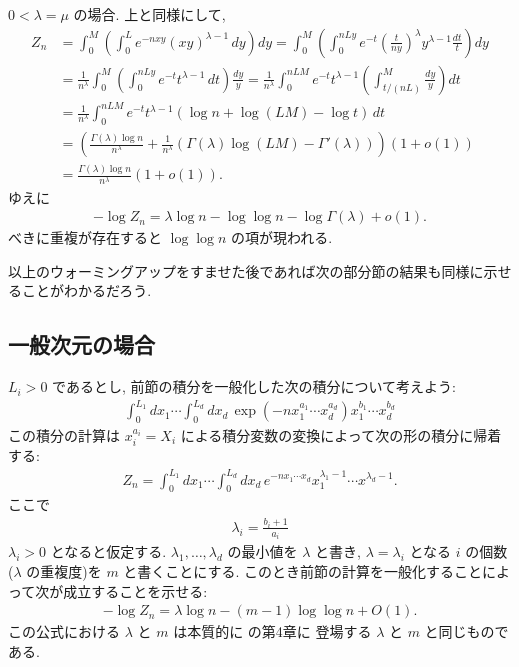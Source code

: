 \documentclass[12pt,twoside]{jarticle}
\theoremstyle{jplain}
\theoremstyle{jplain}
\theoremstyle{jplain}
\numberwithin{theorem}{section}
\numberwithin{equation}{section}
\numberwithin{figure}{section}
\numberwithin{table}{section}
\begin{document}
$0<\lambda=\mu$ の場合. 上と同様にして,
\begin{align*}
Z_n
&=\int_0^M \left(\int_0^L e^{-nxy} (xy)^{\lambda-1}\,dy\right)dy
=\int_0^M \left(\int_0^{nLy} e^{-t} \left(\frac{t}{ny}\right)^\lambda y^{\lambda-1}\frac{dt}{t}\right)dy
\\ &
=\frac{1}{n^\lambda}\int_0^M \left(\int_0^{nLy} e^{-t} t^{\lambda-1}\,dt\right)\frac{dy}{y}
=\frac{1}{n^\lambda}\int_0^{nLM} e^{-t} t^{\lambda-1} \left(\int_{t/(nL)}^{M}\frac{dy}{y}\right)dt
\\ &
=\frac{1}{n^\lambda}\int_0^{nLM} e^{-t} t^{\lambda-1}
\left(\log n + \log(LM) -\log t \right)\,dt
\\ &
=\left(
\frac{\Gamma(\lambda)\log n}{n^\lambda}
+\frac{1}{n^\lambda}
\left(\Gamma(\lambda)\log(LM)-\Gamma'(\lambda)\right)
\right)(1+o(1))
\\ &
=\frac{\Gamma(\lambda)\log n}{n^\lambda}(1+o(1)).
\end{align*}
ゆえに
\begin{align*}
-\log Z_n = \lambda\log n - \log\log n -\log\Gamma(\lambda)+o(1).
\end{align*}
べきに重複が存在すると $\log\log n$ の項が現われる.

以上のウォーミングアップをすませた後であれば次の部分節の結果も同様に示せることがわかるだろう.


\subsection{一般次元の場合}

$L_i>0$ であるとし, 
前節の積分を一般化した次の積分について考えよう:
\begin{align*}
\int_0^{L_1}dx_1\cdots\int_0^{L_d}dx_d\,
\exp\left(-n x_1^{a_1}\cdots x_d^{a_d}\right) x_1^{b_1}\cdots x_d^{b_d}
\end{align*}
この積分の計算は $x_i^{a_i}=X_i$ による積分変数の変換によって次の形の積分に帰着する:
\begin{align*}
Z_n = \int_0^{L_1}dx_1\cdots\int_0^{L_d}dx_d\, e^{-nx_1\cdots x_d} 
x_1^{\lambda_1-1}\cdots x^{\lambda_d-1}.
\end{align*}
ここで
\begin{align*}
\lambda_i = \frac{b_i+1}{a_i}
\end{align*}
$\lambda_i>0$ となると仮定する.
$\lambda_1,\ldots,\lambda_d$ の最小値を $\lambda$ と書き, 
$\lambda=\lambda_i$ となる $i$ の個数($\lambda$ の重複度)を $m$ と書くことにする.
このとき前節の計算を一般化することによって次が成立することを示せる:
\begin{align*}
-\log Z_n = \lambda \log n - (m-1)\log\log n + O(1).
\end{align*}
この公式における $\lambda$ と $m$ は本質的に \cite{watanabe-2012} の第4章に
登場する $\lambda$ と $m$ と同じものである.
\end{document}

